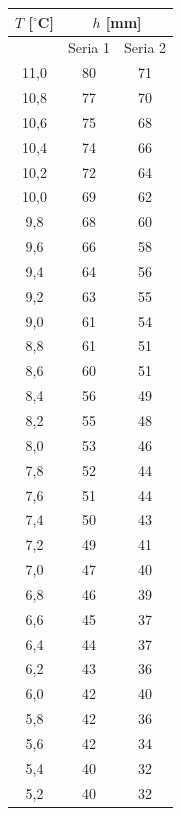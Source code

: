\documentclass[a4paper,12pt]{article}
\begin{document}
\begin{table}[H]
    \centering
    \begin{minipage}{0.48\textwidth}
        \centering
        \begin{tabular}{|c|c|c|}
            \hline
            $T$ [$^\circ$C] & \multicolumn{2}{c|}{$h$ [mm]} \\
            \hline
            & Seria 1 & Seria 2 \\
            \hline
            11{,}0 & 80 & 71 \\
            10{,}8 & 77 & 70 \\
            10{,}6 & 75 & 68 \\
            10{,}4 & 74 & 66 \\
            10{,}2 & 72 & 64 \\
            10{,}0 & 69 & 62 \\
            9{,}8  & 68 & 60 \\
            9{,}6  & 66 & 58 \\
            9{,}4  & 64 & 56 \\
            9{,}2  & 63 & 55 \\
            9{,}0  & 61 & 54 \\
            8{,}8  & 61 & 51 \\
            8{,}6  & 60 & 51 \\
            8{,}4  & 56 & 49 \\
            8{,}2  & 55 & 48 \\
            8{,}0  & 53 & 46 \\
            7{,}8  & 52 & 44 \\
            7{,}6  & 51 & 44 \\
            7{,}4  & 50 & 43 \\
            7{,}2  & 49 & 41 \\
            7{,}0  & 47 & 40 \\
            6{,}8  & 46 & 39 \\
            6{,}6  & 45 & 37 \\
            6{,}4  & 44 & 37 \\
            6{,}2  & 43 & 36 \\
            6{,}0  & 42 & 40 \\
            5{,}8  & 42 & 36 \\
            5{,}6  & 42 & 34 \\
            5{,}4  & 40 & 32 \\
            5{,}2  & 40 & 32 \\

\end{tabular}
\end{minipage}
\end{table}
\end{document}
